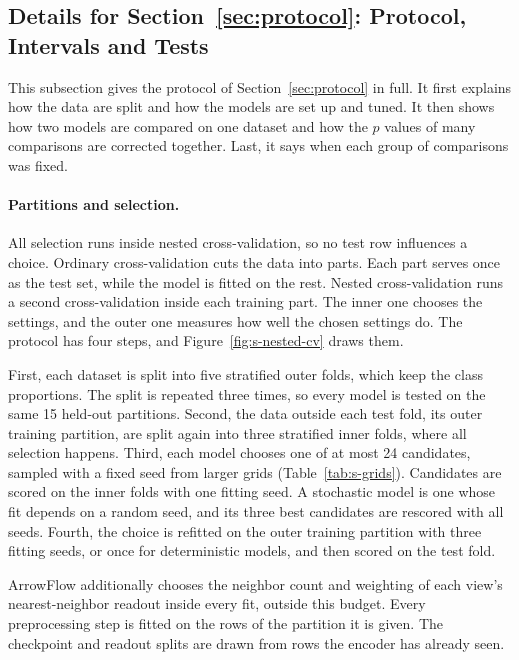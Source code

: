 

\subsection{Details for Section~\ref*{sec:protocol}: Protocol, Intervals and Tests}\label{supp:statistics}

This subsection gives the protocol of Section~\ref{sec:protocol} in full. It first explains how the data are split and how the models are set up and tuned. It then shows how two models are compared on one dataset and how the $p$ values of many comparisons are corrected together. Last, it says when each group of comparisons was fixed.

\paragraph{Partitions and selection.} All selection runs inside nested cross-validation, so no test row influences a choice. Ordinary cross-validation cuts the data into parts. Each part serves once as the test set, while the model is fitted on the rest. Nested cross-validation runs a second cross-validation inside each training part. The inner one chooses the settings, and the outer one measures how well the chosen settings do. The protocol has four steps, and Figure~\ref{fig:s-nested-cv} draws them.

First, each dataset is split into five stratified outer folds, which keep the class proportions. The split is repeated three times, so every model is tested on the same 15 held-out partitions. Second, the data outside each test fold, its outer training partition, are split again into three stratified inner folds, where all selection happens. Third, each model chooses one of at most 24 candidates, sampled with a fixed seed from larger grids (Table~\ref{tab:s-grids}). Candidates are scored on the inner folds with one fitting seed. A stochastic model is one whose fit depends on a random seed, and its three best candidates are rescored with all seeds. Fourth, the choice is refitted on the outer training partition with three fitting seeds, or once for deterministic models, and then scored on the test fold.



ArrowFlow additionally chooses the neighbor count and weighting of each view's nearest-neighbor readout inside every fit, outside this budget. Every preprocessing step is fitted on the rows of the partition it is given. The checkpoint and readout splits are drawn from rows the encoder has already seen.

